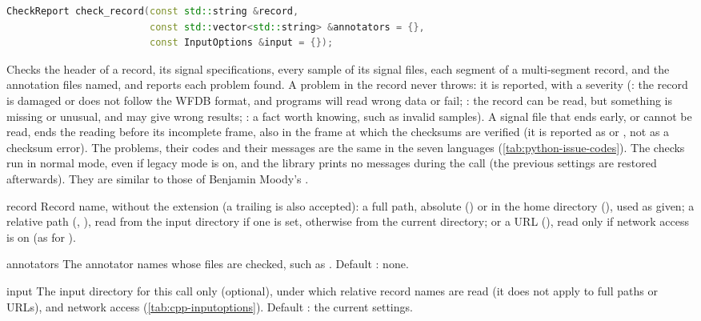 \begin{lstlisting}[language=C++,style=signature]
CheckReport check_record(const std::string &record,
                         const std::vector<std::string> &annotators = {},
                         const InputOptions &input = {});
\end{lstlisting}
Checks the header of a record, its signal specifications, every sample of its signal
files, each segment of a multi-segment record, and the annotation files named, and
reports each problem found. A problem in the record never throws: it is reported, with a
severity (: the record is damaged or does not follow the WFDB format, and
programs will read wrong data or fail; : the record can be read, but
something is missing or unusual, and may give wrong results; : a fact worth
knowing, such as invalid samples). A signal file that ends early, or cannot be read, ends
the reading before its incomplete frame, also in the frame at which the checksums are
verified (it is reported as  or , not as a checksum
error). The problems, their codes and their messages are the same in the seven languages
(\cref{tab:python-issue-codes}). The checks run in normal mode, even if legacy mode is on,
and the library prints no messages during the call (the previous settings are restored
afterwards). They are similar to those of Benjamin Moody's
.
\begin{params}
\item[record] Record name, without the  extension (a trailing  is
  also accepted): a full path, absolute () or in the home
  directory (), used as given; a relative path
  (, ), read from the input directory if one is set,
  otherwise from the current directory; or a URL
  (), read only if network access is
  on (as for ).
\item[annotators] The annotator names whose files are checked, such as
  . Default \code{\{\}}: none.
\item[input] The input directory for this call only (optional), under which relative
  record names are read (it does not apply to full paths or URLs), and network access
  (\cref{tab:cpp-inputoptions}). Default \code{\{\}}: the current settings.
\end{params}
